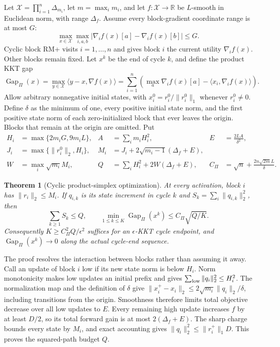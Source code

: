 \documentclass{article}
\newtheorem{theorem}{Theorem}
\newcommand{\Gap}{\operatorname{Gap}}
\begin{document}
Let $\mathcal X=\prod_{i=1}^n\Delta_{m_i}$, let $m=\max_i m_i$, and let $f:\mathcal X\to\mathbb R$ be $L$-smooth in Euclidean norm, with range $\Delta_f$. Assume every block-gradient coordinate range is at most $G$:
\begin{equation}
\max_{x\in\mathcal X}\max_{i,a,b}|\nabla_i f(x)[a]-\nabla_i f(x)[b]|\le G.
\label{eq:productrange}
\end{equation}
Cyclic block RM+ visits $i=1,\ldots,n$ and gives block $i$ the current utility $\nabla_i f(x)$. Other blocks remain fixed. Let $x^k$ be the end of cycle $k$, and define the product KKT gap
\begin{equation}
\Gap_\Pi(x)=\max_{y\in\mathcal X}\langle y-x,\nabla f(x)\rangle
=\sum_{i=1}^n\left(\max_a\nabla_i f(x)[a]-\langle x_i,\nabla_i f(x)\rangle\right).
\label{eq:productgap}
\end{equation}
Allow arbitrary nonnegative initial states, with $x_i^0=r_i^0/\|r_i^0\|_1$ whenever $r_i^0\ne0$. Define $\delta$ as the minimum of one, every positive initial state norm, and the first positive state norm of each zero-initialized block that ever leaves the origin. Blocks that remain at the origin are omitted. Put
\begin{align}
H_i&=\max\{2m_iG,9m_iL\}, & A&=\sum_i m_iH_i^2, & E&=\frac{2LA}{\delta^2},\label{eq:productconstants1}\\
J_i&=\max\{\|r_i^0\|_2,H_i\}, & M_i&=J_i+2\sqrt{m_i-1}(\Delta_f+E),\label{eq:productconstants2}\\
W&=\max_i\sqrt{m_i}M_i, & Q&=\sum_iH_i^2+2W(\Delta_f+E), & C_\Pi&=\sqrt n+\frac{2n\sqrt{2m}L}{\delta}.
\label{eq:productconstants3}
\end{align}

\begin{theorem}[Cyclic product-simplex optimization]
\label{thm:product}
At every activation, block $i$ has $\|r_i\|_2\le M_i$. If $q_{i,k}$ is its state increment in cycle $k$ and $S_k=\sum_i\|q_{i,k}\|_2^2$, then
\begin{equation}
\sum_{k\ge1}S_k\le Q,
\qquad
\min_{1\le k\le K}\Gap_\Pi(x^k)\le C_\Pi\sqrt{Q/K}.
\label{eq:productrate}
\end{equation}
Consequently $K\ge C_\Pi^2Q/\epsilon^2$ suffices for an $\epsilon$-KKT cycle endpoint, and $\Gap_\Pi(x^k)\to0$ along the actual cycle-end sequence.
\end{theorem}

The proof resolves the interaction between blocks rather than assuming it away. Call an update of block $i$ low if its new state norm is below $H_i$. Norm monotonicity makes low updates an initial prefix and gives $\sum_{\rm low}\|q_i\|_2^2\le H_i^2$. The normalization map and the definition of $\delta$ give $\|x_i^+-x_i\|_2\le2\sqrt{m_i}\|q_i\|_2/\delta$, including transitions from the origin. Smoothness therefore limits total objective decrease over all low updates to $E$. Every remaining high update increases $f$ by at least $D/2$, so its total forward gain is at most $2(\Delta_f+E)$. The sharp charge bounds every state by $M_i$, and exact accounting gives $\|q_i\|_2^2\le\|r_i^+\|_1D$. This proves the squared-path budget $Q$.
\end{document}
